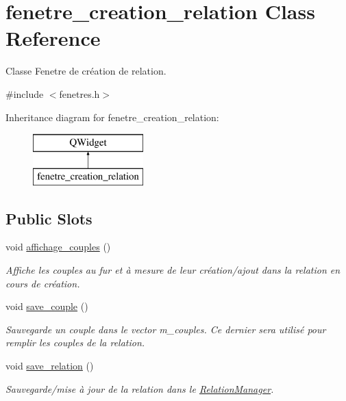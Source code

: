 \hypertarget{classfenetre__creation__relation}{}\section{fenetre\+\_\+creation\+\_\+relation Class Reference}
\label{classfenetre__creation__relation}


Classe Fenetre de création de relation.  




{\ttfamily \#include $<$fenetres.\+h$>$}

Inheritance diagram for fenetre\+\_\+creation\+\_\+relation\+:\begin{figure}[H]
\begin{center}
\leavevmode
\includegraphics[height=2.000000cm]{classfenetre__creation__relation}
\end{center}
\end{figure}
\subsection*{Public Slots}
\begin{DoxyCompactItemize}
\item 
\mbox{\label{classfenetre__creation__relation_ac5b715961f109f3bb403d8ca37faed71}} 
void \hyperlink{classfenetre__creation__relation_ac5b715961f109f3bb403d8ca37faed71}{affichage\+\_\+couples} ()
\begin{DoxyCompactList}\small\item\em Affiche les couples au fur et à mesure de leur création/ajout dans la relation en cours de création. \end{DoxyCompactList}\item 
\mbox{\label{classfenetre__creation__relation_ad8b233b34d0e2775108683e09a8d966d}} 
void \hyperlink{classfenetre__creation__relation_ad8b233b34d0e2775108683e09a8d966d}{save\+\_\+couple} ()
\begin{DoxyCompactList}\small\item\em Sauvegarde un couple dans le vector m\+\_\+couples. Ce dernier sera utilisé pour remplir les couples de la relation. \end{DoxyCompactList}\item 
\mbox{\label{classfenetre__creation__relation_af9891e79cff26ef704cfdae9cfa46752}} 
void \hyperlink{classfenetre__creation__relation_af9891e79cff26ef704cfdae9cfa46752}{save\+\_\+relation} ()
\begin{DoxyCompactList}\small\item\em Sauvegarde/mise à jour de la relation dans le \hyperlink{class_relation_manager}{Relation\+Manager}. \end{DoxyCompactList}\end{DoxyCompactItemize}
